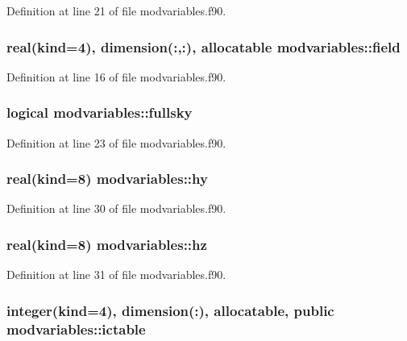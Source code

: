 Definition at line 21 of file modvariables.\-f90.

\hypertarget{classmodvariables_a07bff5345df2040ae2d0f7e6d67f9a5c}{
\subsubsection[{field}]{\setlength{\rightskip}{0pt plus 5cm}real(kind=4), dimension(\-:,\-:), allocatable modvariables\-::field}}\label{classmodvariables_a07bff5345df2040ae2d0f7e6d67f9a5c}


Definition at line 16 of file modvariables.\-f90.

\hypertarget{classmodvariables_ace518a722b9c63f8c88c4915aa9a7549}{
\subsubsection[{fullsky}]{\setlength{\rightskip}{0pt plus 5cm}logical modvariables\-::fullsky}}\label{classmodvariables_ace518a722b9c63f8c88c4915aa9a7549}


Definition at line 23 of file modvariables.\-f90.

\hypertarget{classmodvariables_a31a775c0bcadfce141cc3cebf22df9ff}{
\subsubsection[{hy}]{\setlength{\rightskip}{0pt plus 5cm}real(kind=8) modvariables\-::hy}}\label{classmodvariables_a31a775c0bcadfce141cc3cebf22df9ff}


Definition at line 30 of file modvariables.\-f90.

\hypertarget{classmodvariables_a26d18952766121089d4309f2449d8b29}{
\subsubsection[{hz}]{\setlength{\rightskip}{0pt plus 5cm}real(kind=8) modvariables\-::hz}}\label{classmodvariables_a26d18952766121089d4309f2449d8b29}


Definition at line 31 of file modvariables.\-f90.

\hypertarget{classmodvariables_a16ace0f388a2561105bd96f1a1af77b4}{
\subsubsection[{ictable}]{\setlength{\rightskip}{0pt plus 5cm}integer(kind=4), dimension(\-:), allocatable, public modvariables\-::ictable}}\label{classmodvariables_a16ace0f388a2561105bd96f1a1af77b4}


